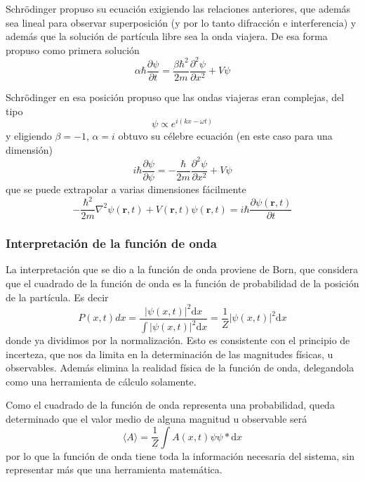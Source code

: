 Schrödinger propuso su ecuación exigiendo las relaciones anteriores, que además sea lineal para observar superposición (y por lo tanto difracción e interferencia) y además que la solución de partícula libre sea la onda viajera.
De esa forma propuso como primera solución
\[\alpha \hbar \frac{\partial \psi}{\partial t} = \frac{\beta \hbar^2}{2m} \frac{\partial ^2 \psi}{\partial x^2} + V \psi\]

Schrödinger en esa posición propuso que las ondas viajeras eran complejas, del tipo
\[ \psi \propto e^{i (k x - \omega t)}\]
y eligiendo $\beta = - 1$, $\alpha = i$ obtuvo su célebre ecuación (en este caso para una dimensión)
\begin{equation}
    i \hbar \frac{\partial \psi}{\partial \psi} = - \frac{\hbar}{2m} \frac{\partial^2 \psi}{\partial x^2} + V \psi
\end{equation}
que se puede extrapolar a varias dimensiones fácilmente
\begin{equation}
- \frac{\hbar^2}{2m} \nabla^2 \psi(\textbf{r},t) + V(\textbf{r},t) \psi(\textbf{r},t) = i \hbar \frac{\partial \psi(\textbf{r},t)}{\partial t}
\end{equation}

\subsubsection{Interpretación de la función de onda}
La interpretación que se dio a la función de onda proviene de Born, que considera que el cuadrado de la función de onda es la función de probabilidad de la posición de la partícula.
Es decir
\begin{equation}
    P(x, t) dx = \frac{|\psi(x, t)|^2 \mathrm{d}x}{\int |\psi(x, t)|^2 \mathrm{d}x} = \frac{1}{Z} |\psi(x, t)|^2 \mathrm{d}x
\end{equation}
donde ya dividimos por la normalización.
Esto es consistente con el principio de incerteza, que nos da limita en la determinación de las magnitudes físicas, u observables.
Además elimina la realidad física de la función de onda, delegandola como una herramienta de cálculo solamente.

Como el cuadrado de la función de onda representa una probabilidad, queda determinado que el valor medio de alguna magnitud u observable será
\begin{equation}
    \langle A \rangle = \frac{1}{Z} \int A(x, t) \psi \psi * \mathrm{d}x
\end{equation}
por lo que la función de onda tiene toda la información necesaria del sistema, sin representar más que una herramienta matemática.

